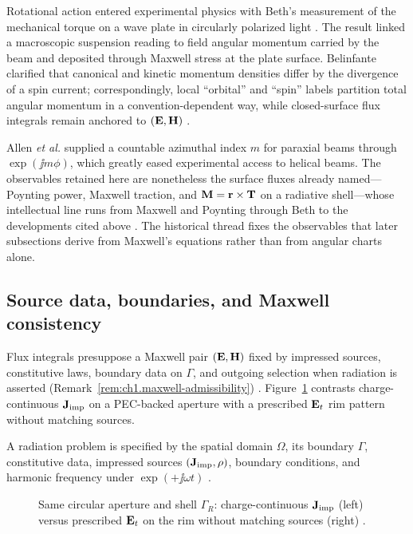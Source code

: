 Rotational action entered experimental physics with Beth's measurement of the
mechanical torque on a wave plate in circularly polarized light \cite{beth1936}. The result
linked a macroscopic suspension reading to field angular momentum carried by the beam and
deposited through Maxwell stress at the plate surface. Belinfante
\cite{belinfante1940} clarified that canonical and kinetic momentum densities differ by
the divergence of a spin current; correspondingly, local ``orbital'' and ``spin''
labels partition total angular momentum in a convention-dependent way, while closed-surface
flux integrals remain anchored to $(\mathbf{E},\mathbf{H})$ \cite{belinfante1940,stratton1941}.

Allen \emph{et al.} \cite{allen1992} supplied a countable azimuthal index $m$ for paraxial
beams through $\exp(\jj m\phi)$, which greatly eased experimental access to helical beams.
The observables retained here are nonetheless the surface fluxes already named---Poynting
power, Maxwell traction, and $\mathbf{M}=\mathbf{r}\times\mathbf{T}$ on a radiative shell---whose
intellectual line runs from Maxwell and Poynting through Beth to the developments cited
above \cite{poynting1884,beth1936,allen1992}. The historical thread fixes the observables that later subsections derive from Maxwell's equations rather than from angular charts alone.

\subsection{Source data, boundaries, and Maxwell consistency}
\label{sec:ch01.0.1}

Flux integrals presuppose a Maxwell pair $(\mathbf{E},\mathbf{H})$ fixed by impressed sources, constitutive laws, boundary data on $\Gamma$, and outgoing selection when radiation is asserted (Remark~\ref{rem:ch1.maxwell-admissibility}) \cite{stratton1941,maxwell1873,harrington2001}. Figure~\ref{fig:ch1.wp-matched-aperture} contrasts charge-continuous $\mathbf{J}_{\mathrm{imp}}$ on a PEC-backed aperture with a prescribed $\mathbf{E}_t$ rim pattern without matching sources.

A radiation problem is specified by the spatial domain $\Omega$, its boundary $\Gamma$, constitutive data, impressed sources $(\mathbf{J}_{\mathrm{imp}},\rho)$, boundary conditions, and harmonic frequency under $\exp(+\jj\omega t)$ \cite{stratton1941}.

\begin{figure}[t]
\centering
\VolIPhysFig{\VolIPhysMatchedAperture}
\caption{Same circular aperture and shell $\Gamma_R$: charge-continuous $\mathbf{J}_{\mathrm{imp}}$ (left) versus prescribed $\mathbf{E}_t$ on the rim without matching sources (right) \cite{stratton1941,harrington2001}.}
\label{fig:ch1.wp-matched-aperture}
\end{figure}

